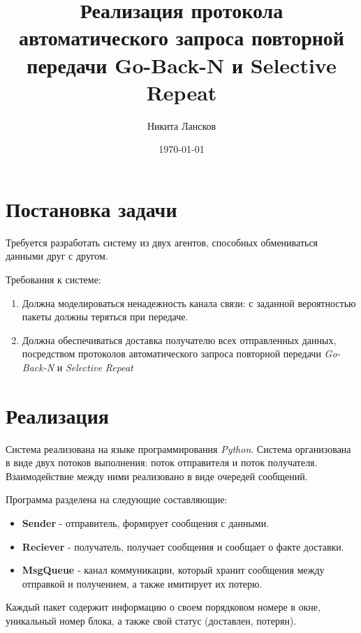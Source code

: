 \documentclass[a4paper,12pt]{article}
\author{Никита Лансков}
\title{Реализация протокола автоматического запроса повторной передачи
       Go-Back-N и Selective Repeat}
\date{\today}
\begin{document}

\maketitle
\tableofcontents

\newpage

\section{Постановка задачи}

Требуется разработать систему из двух агентов, способных обмениваться данными
друг с другом.

Требования к системе:

\begin{enumerate}
    \item Должна моделироваться ненадежность канала связи: с заданной
        вероятностью пакеты должны теряться при передаче.
    \item Должна обеспечиваться доставка получателю всех отправленных данных, 
        посредством протоколов автоматического запроса повторной передачи
        \textit{Go-Back-N} и \textit{Selective Repeat}
\end{enumerate}

\section{Реализация}

Система реализована на языке программирования \textit{Python}. Система 
организована в виде двух потоков выполнения: поток отправителя и поток 
получателя. Взаимодействие между ними реализовано в виде очередей сообщений.

Программа разделена на следующие составляющие:
\begin{itemize}
    \item \textbf{Sender} - отправитель, формирует сообщения с данными.
    \item \textbf{Reciever} - получатель, получает сообщения и сообщает о факте
        доставки.
    \item \textbf{MsgQueue} - канал коммуникации, который хранит сообщения 
        между отправкой и получением, а также имитирует их потерю.
\end{itemize}

Каждый пакет содержит информацию о своем порядковом номере в окне, уникальный
номер блока, а также свой статус (доставлен, потерян).
\end{document}
